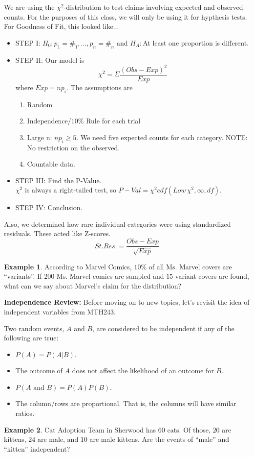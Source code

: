 \documentclass[12pt]{amsart}
\theoremstyle{definition}
\newtheorem{ex}{Example}
\begin{document}
 \begin{framed}
 We are using the $\chi^2$-distribution to test claims involving expected and observed counts. For the purposes of this class, we will only be using it for hypthesis tests. For Goodness of Fit, this looked like...
 \begin{itemize}
  \item STEP I: $H_0:p_1=\#_1,...,p_n=\#_n$ and $H_A:$At least one proportion is different.
  \item STEP II: Our model is $$\chi^2=\Sigma \frac{(Obs-Exp)^2}{Exp}$$ where $Exp=np_i$. The assumptions are
  \begin{enumerate}
   \item Random
   \item Independence/$10\%$ Rule for each trial
   \item Large n: $np_i\geq5$. We need five expected counts for each category. NOTE: No restriction on the observed.
   \item Countable data.
  \end{enumerate}
  \item STEP III: Find the P-Value.\\$\chi^2$ is always a right-tailed test, so $P-Val=\chi^2cdf(Low\,\chi^2,\infty,df)$.
  \item STEP IV: Conclusion.
 \end{itemize}
Also, we determined how rare individual categories were using standardized residuals. These acted like Z-scores. $$St. Res.=\frac{Obs-Exp}{\sqrt{Exp}}$$
 \end{framed}

\begin{ex} According to Marvel Comics, $10\%$ of all Ms. Marvel covers are ``variants''. If $200$ Ms. Marvel comics are sampled and $15$ variant covers are found, what can we say about Marvel's claim for the distribution?
\end{ex}
\vfill
\newpage
\textbf{Independence Review:} Before moving on to new topics, let's revisit the idea of independent variables from MTH243.
\begin{framed}
 Two random events, $A$ and $B$, are considered to be independent if any of the following are true:
 \begin{itemize}
  \item $P(A)=P(A|B)$.
  \item The outcome of $A$ does not affect the likelihood of an outcome for $B$.
  \item $P(A\text{ and }B)=P(A)P(B)$.
  \item The column/rows are proportional. That is, the columns will have similar ratios.
 \end{itemize}
\end{framed}
\begin{ex} Cat Adoption Team in Sherwood has $60$ cats. Of those, $20$ are kittens, $24$ are male, and $10$ are male kittens. Are the events of ``male'' and ``kitten'' independent?
\end{ex}
\end{document}
